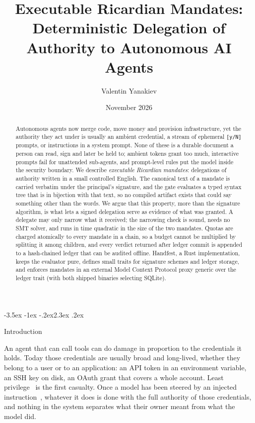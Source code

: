 \documentclass[10pt,twocolumn]{article}
\title{\textbf{Executable Ricardian Mandates: Deterministic Delegation of Authority to Autonomous AI Agents}}
\author{Valentin Yanakiev}
\date{November 2026}
\makeatletter
\theoremstyle{plain}
\theoremstyle{definition}
\renewcommand\section{\@startsection{section}{1}{\z@}%
  {-3.5ex \@plus -1ex \@minus -.2ex}{2.3ex \@plus .2ex}%
  {\normalfont\Large\bfseries\raggedright}}
\makeatother
\begin{document}
\maketitle

\begin{abstract}
Autonomous agents now merge code, move money and provision infrastructure, yet the authority they act under is usually an ambient credential, a stream of ephemeral \texttt{[y/N]} prompts, or instructions in a system prompt. None of these is a durable document a person can read, sign and later be held to; ambient tokens grant too much, interactive prompts fail for unattended sub-agents, and prompt-level rules put the model inside the security boundary. We describe \emph{executable Ricardian mandates}: delegations of authority written in a small controlled English. The canonical text of a mandate is carried verbatim under the principal's signature, and the gate evaluates a typed syntax tree that is in bijection with that text, so no compiled artifact exists that could say something other than the words. We argue that this property, more than the signature algorithm, is what lets a signed delegation serve as evidence of what was granted. A delegate may only narrow what it received; the narrowing check is sound, needs no SMT solver, and runs in time quadratic in the size of the two mandates. Quotas are charged atomically to every mandate in a chain, so a budget cannot be multiplied by splitting it among children, and every verdict returned after ledger commit is appended to a hash-chained ledger that can be audited offline. Handfest, a Rust implementation, keeps the evaluator pure, defines small traits for signature schemes and ledger storage, and enforces mandates in an external Model Context Protocol proxy generic over the ledger trait (with both shipped binaries selecting SQLite).
\end{abstract}

\section{Introduction}
\label{sec:intro}

An agent that can call tools can do damage in proportion to the credentials it holds. Today those credentials are usually broad and long-lived, whether they belong to a user or to an application: an API token in an environment variable, an SSH key on disk, an OAuth grant that covers a whole account. Least privilege~\cite{saltzer1975protection} is the first casualty. Once a model has been steered by an injected instruction~\cite{greshake2023indirect}, whatever it does is done with the full authority of those credentials, and nothing in the system separates what their owner meant from what the model did.
\end{document}
